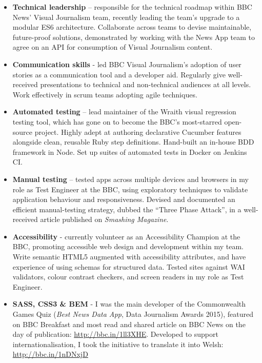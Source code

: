 \documentclass[class=article, crop=false]{standalone}
\begin{document}
\begin{itemize}
    \setlength\itemsep{0.3em}

    \item \textbf{Technical leadership} –  responsible for the technical roadmap within BBC News' Visual Journalism team, recently leading the team's upgrade to a modular ES6 architecture. Collaborate across teams to devise maintainable, future-proof solutions, demonstrated by working with the News App team to agree on an API for consumption of Visual Journalism content.

    \item \textbf{Communication skills} - led BBC Visual Journalism's adoption of user stories as a communication tool and a developer aid. Regularly give well-received presentations to technical and non-technical audiences at all levels. Work effectively in scrum teams adopting agile techniques.

    \item \textbf{Automated testing} – lead maintainer of the Wraith visual regression testing tool, which has gone on to become the BBC's most-starred open-source project. Highly adept at authoring declarative Cucumber features alongside clean, reusable Ruby step definitions. Hand-built an in-house BDD framework in Node. Set up suites of automated tests in Docker on Jenkins CI.

    \item \textbf{Manual testing} – tested apps across multiple devices and browsers in my role as Test Engineer at the BBC, using exploratory techniques to validate application behaviour and responsiveness. Devised and documented an efficient manual-testing strategy, dubbed the ``Three Phase Attack'', in a well-received article published on \emph{Smashing Magazine}.

    \item \textbf{Accessibility} - currently volunteer as an Accessibility Champion at the BBC, promoting accessible web design and development within my team. Write semantic HTML5 augmented with accessibility attributes, and have experience of using schemas for structured data. Tested sites against WAI validators, colour contrast checkers, and screen readers in my role as Test Engineer.

    \item \textbf{SASS, CSS3 \& BEM} - I was the main developer of the Commonwealth Games Quiz (\emph{Best News Data App}, Data Journalism Awards 2015), featured on BBC Breakfast and most read and shared article on BBC News on the day of publication: \url{http://bbc.in/1ll3XHE}. Developed to support internationalisation, I took the initiative to translate it into Welsh: \url{http://bbc.in/1nDNxjD}


\end{itemize}
\end{document}
